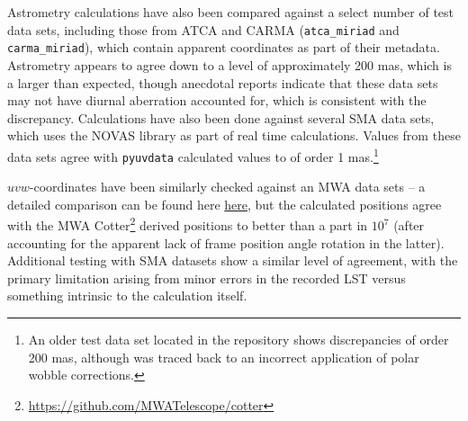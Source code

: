 \documentclass[11pt, oneside]{article}
\begin{document}
Astrometry calculations have also been compared against a select number of test data sets, including those from ATCA and CARMA (\verb!atca_miriad! and \verb!carma_miriad!), which contain apparent coordinates as part of their metadata. Astrometry appears to agree down to a level of approximately 200 mas, which is a larger than expected, though anecdotal reports indicate that these data sets may not have diurnal aberration accounted for, which is consistent with the discrepancy. Calculations have also been done against several SMA data sets, which uses the NOVAS library as part of real time calculations. Values from these data sets agree with \texttt{pyuvdata} calculated values to of order 1 mas.\footnote{An older test data set located in the repository shows discrepancies of order 200 mas, although was traced back to an incorrect application of polar wobble corrections.}

$uvw$-coordinates have been similarly checked against an MWA data sets -- a detailed comparison can be found here \href{https://github.com/RadioAstronomySoftwareGroup/pyuvdata/files/6525743/new.phasing.pdf}{here}, but the calculated positions agree with the MWA Cotter\footnote{\url{https://github.com/MWATelescope/cotter}} derived positions to better than a part in $10^7$ (after accounting for the apparent lack of frame position angle rotation in the latter). Additional testing with SMA datasets show a similar level of agreement, with the primary limitation arising from minor errors in the recorded LST versus something intrinsic to the calculation itself. 

%
% 


 
\end{document}
